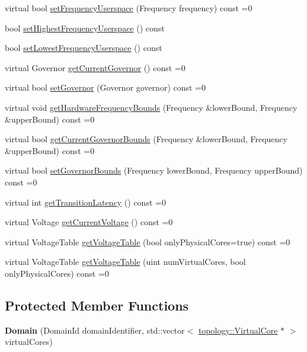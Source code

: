 \begin{DoxyCompactItemize}
\item 
virtual bool \hyperlink{classmammut_1_1cpufreq_1_1Domain_a6f97e04fa138bbb6b478c8a7338b4116}{set\-Frequency\-Userspace} (Frequency frequency) const =0
\item 
bool \hyperlink{classmammut_1_1cpufreq_1_1Domain_ab4a7179ca9f0b0ed372579dacc93c196}{set\-Highest\-Frequency\-Userspace} () const 
\item 
bool \hyperlink{classmammut_1_1cpufreq_1_1Domain_ae473572f0b075de12bcf063b49815086}{set\-Lowest\-Frequency\-Userspace} () const 
\item 
virtual Governor \hyperlink{classmammut_1_1cpufreq_1_1Domain_a938483ec97ed59d0559758a1a467dc62}{get\-Current\-Governor} () const =0
\item 
virtual bool \hyperlink{classmammut_1_1cpufreq_1_1Domain_a48cb064376b9b663e5a134a61b5780bd}{set\-Governor} (Governor governor) const =0
\item 
virtual void \hyperlink{classmammut_1_1cpufreq_1_1Domain_a652712c9192a755fb2bc6b58076eccb8}{get\-Hardware\-Frequency\-Bounds} (Frequency \&lower\-Bound, Frequency \&upper\-Bound) const =0
\item 
virtual bool \hyperlink{classmammut_1_1cpufreq_1_1Domain_af95ae412f43dfbf60a77715ef4684c0f}{get\-Current\-Governor\-Bounds} (Frequency \&lower\-Bound, Frequency \&upper\-Bound) const =0
\item 
virtual bool \hyperlink{classmammut_1_1cpufreq_1_1Domain_a45a0a69b4957937c921e723bbcf6cf04}{set\-Governor\-Bounds} (Frequency lower\-Bound, Frequency upper\-Bound) const =0
\item 
virtual int \hyperlink{classmammut_1_1cpufreq_1_1Domain_a0c7d34dc9ee1e5eb57200a127ae9f183}{get\-Transition\-Latency} () const =0
\item 
virtual Voltage \hyperlink{classmammut_1_1cpufreq_1_1Domain_acd823bdc2f011c042dbb272c4d63df3c}{get\-Current\-Voltage} () const =0
\item 
virtual Voltage\-Table \hyperlink{classmammut_1_1cpufreq_1_1Domain_ad0b11fad2e36e45d6028de662df63ba8}{get\-Voltage\-Table} (bool only\-Physical\-Cores=true) const =0
\item 
virtual Voltage\-Table \hyperlink{classmammut_1_1cpufreq_1_1Domain_a4442dfd2b7d52a95ad4bdf3e99185bf3}{get\-Voltage\-Table} (uint num\-Virtual\-Cores, bool only\-Physical\-Cores) const =0
\end{DoxyCompactItemize}
\subsection*{Protected Member Functions}
\begin{DoxyCompactItemize}
\item 
\hypertarget{classmammut_1_1cpufreq_1_1Domain_a7c5ae0a8f2109fa0adfcf891e6696b0f}{{\bfseries Domain} (Domain\-Id domain\-Identifier, std\-::vector$<$ \hyperlink{classmammut_1_1topology_1_1VirtualCore}{topology\-::\-Virtual\-Core} $\ast$ $>$ virtual\-Cores)}\label{classmammut_1_1cpufreq_1_1Domain_a7c5ae0a8f2109fa0adfcf891e6696b0f}

\end{DoxyCompactItemize}
